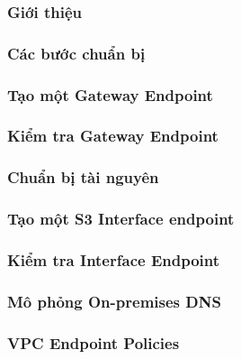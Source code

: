 \subsubsection{Giới thiệu}


\subsubsection{Các bước chuẩn bị}




\subsubsection{Tạo một Gateway Endpoint}


\subsubsection{Kiểm tra Gateway Endpoint}




\subsubsection{Chuẩn bị tài nguyên}


\subsubsection{Tạo một S3 Interface endpoint}


\subsubsection{Kiểm tra Interface Endpoint}


\subsubsection{Mô phỏng On-premises DNS }


\subsubsection{VPC Endpoint Policies}



